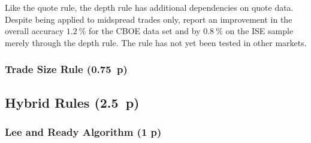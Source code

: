 Like the quote rule, the depth rule has additional dependencies on quote data. Despite being applied to midspread trades only, \textcite[][4]{grauerOptionTradeClassification2022} report an improvement in the overall accuracy $1.2~\%$ for the CBOE data set and by $0.8~\%$ on the ISE sample merely through the depth rule. The rule has not yet been tested in other markets.


\subsubsection{Trade Size Rule (0.75~p)}\label{sec:trade-size-rule}







\subsection{Hybrid Rules (2.5~p)}\label{sec:hybrid-rules}

\subsubsection{Lee and Ready Algorithm (1 p)}\label{sec:lee-and-ready-algorithm}



